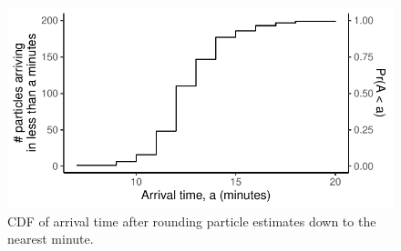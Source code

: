 \begin{knitrout}\small
{}\color{fgcolor}\begin{figure}

{\centering \includegraphics[width=.6\textwidth]{figure/eta_cdf-1} 

}

\caption[CDF of arrival time after rounding particle estimates down to the nearest minute]{CDF of arrival time after rounding particle estimates down to the nearest minute.}\label{fig:eta_cdf}
\end{figure}


\end{knitrout}





